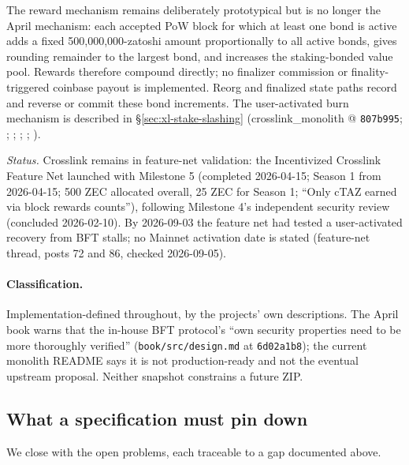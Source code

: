 \documentclass[11pt,a4paper]{article}
\theoremstyle{definition}
\begin{document}
The reward mechanism remains deliberately prototypical but is no longer
the April mechanism: each accepted PoW block for which at least one bond
is active adds a fixed 500{,}000{,}000-zatoshi amount proportionally to
all active bonds, gives rounding remainder to the largest bond, and
increases the staking-bonded value pool. Rewards therefore compound
directly; no finalizer commission
or finality-triggered coinbase payout is implemented. Reorg and finalized
state paths record and reverse or commit these bond increments. The
user-activated burn mechanism is described in
\S\ref{sec:xl-stake-slashing}
(crosslink\_monolith @ \texttt{807b995};
;
;
;
;
).

\emph{Status.} Crosslink remains in feature-net validation: the
Incentivized Crosslink Feature Net launched with Milestone 5 (completed
2026-04-15; Season 1 from 2026-04-15; 500 ZEC allocated overall, 25 ZEC
for Season 1; ``Only cTAZ earned via block rewards counts''), following
Milestone 4's independent security review (concluded 2026-02-10). By
2026-09-03 the feature net had tested a user-activated recovery from BFT
stalls; no Mainnet activation date is stated (feature-net thread, posts
72 and 86, checked 2026-09-05).

\paragraph{Classification.} Implementation-defined throughout, by the
projects' own descriptions. The April book warns that the in-house BFT protocol's
``own security properties need to be more thoroughly verified''
(\texttt{book/src/design.md} at \texttt{6d02a1b8}); the current monolith
README says it is not production-ready and not the eventual upstream
proposal. Neither snapshot constrains a future ZIP.

\subsection{What a specification must pin down}\label{sec:xl-stake-open}

We close with the open problems, each traceable to a gap documented
above.
\end{document}
